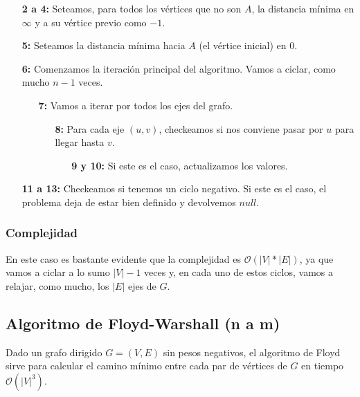 \begin{enumerate}
\item [\textbf{2 a 4:}] Seteamos, para todos los v\'ertices que no son $A$, la distancia m\'inima en $\infty$ y a su v\'ertice previo como $-1$.
\item [\textbf{5:}] Seteamos la distancia m\'inima hacia $A$ (el v\'ertice inicial) en $0$.
\item [\textbf{6:}] Comenzamos la iteraci\'on principal del algoritmo. Vamos a ciclar, como mucho $n-1$ veces.
    \begin{enumerate}
    \item [\textbf{7:}] Vamos a iterar por todos los ejes del grafo.
        \begin{enumerate}
        \item [\textbf{8:}] Para cada eje $(u, v)$, checkeamos si nos conviene pasar por $u$ para llegar hasta $v$.
            \begin{enumerate}
            \item [\textbf{9 y 10:}] Si este es el caso, actualizamos los valores.
            \end{enumerate}
        \end{enumerate}
    \end{enumerate}
\item [\textbf{11 a 13:}] Checkeamos si tenemos un ciclo negativo. Si este es el caso, el problema deja de estar bien definido y devolvemos $null$.
\end{enumerate}

\subsubsection*{Complejidad}

En este caso es bastante evidente que la complejidad es $\mathcal{O}(|V| * |E|)$, ya que vamos a ciclar a lo sumo $|V|-1$ veces y, en cada uno de estos ciclos, vamos a relajar, como mucho, los $|E|$ ejes de $G$.

\newpage
\subsection{Algoritmo de Floyd-Warshall (n a m)}

Dado un grafo dirigido $G = (V, E)$ sin pesos negativos, el algoritmo de Floyd sirve para calcular el camino m\'inimo entre cada par de v\'ertices de $G$ en tiempo $\mathcal{O}(|V|^3)$.


